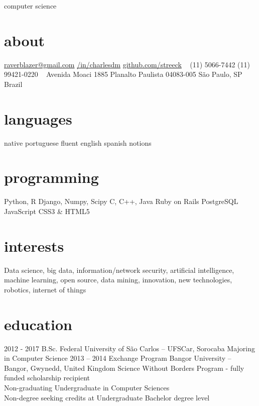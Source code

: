 \documentclass[]{friggeri-cv}
\begin{document}
       {computer science}


\begin{aside}
  \section{about}
    \href{mailto:raverblazer@gmail.com}{raverblazer@gmail.com}
    \href{http://www.linkedin.com/in/charlesdm}{\faLinkedinSign \space  /in/charlesdm}
    \href{https://github.com/streeck}{\faGithubSign \space github.com/streeck}
    ~
    (11) 5066-7442
    (11) 99421-0220
    ~
    Avenida Moaci 1885
    Planalto Paulista
    04083-005
    São Paulo, SP
    Brazil
  \section{languages}
    native portuguese
    fluent english
    spanish notions
  \section{programming}
    Python, R
    Django, Numpy, Scipy
    C, C++, Java
    Ruby on Rails
    PostgreSQL
    JavaScript
    CSS3 \& HTML5
\end{aside}

\section{interests}

Data science, big data, information/network security, artificial intelligence, machine learning, open source, data mining, innovation, new technologies, robotics, internet of things

\section{education}

\begin{entrylist}
  \entry
    {2012 - 2017}
    {B.Sc.}
    {Federal University of São Carlos -- UFSCar, Sorocaba}
    {Majoring in Computer Science}
  \entry
    {2013 – 2014}
    {Exchange Program}
    {Bangor University -- Bangor, Gwynedd, United Kingdom}
    {Science Without Borders Program - fully funded scholarship recipient \\
    Non-graduating Undergraduate in Computer Sciences \\
    Non-degree seeking credits at Undergraduate Bachelor degree level}
\end{entrylist}
\end{document}
